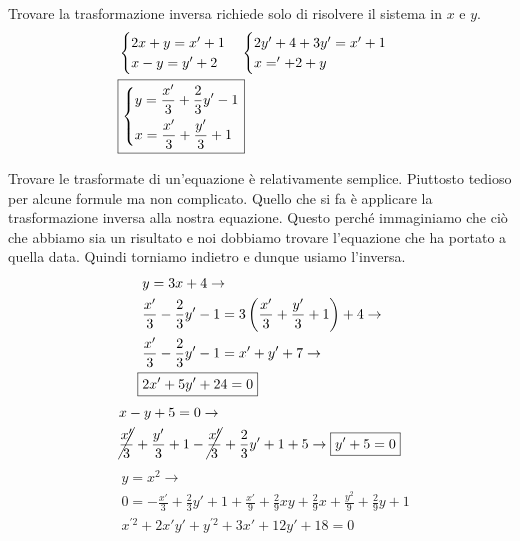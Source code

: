 Trovare la trasformazione inversa richiede solo di risolvere il sistema in $x$ e $y$.
\begin{align*}
&\begin{cases}
2x+y=x'+1\\
x-y=y'+2
\end{cases}
\begin{cases}
2y'+4+3y'=x'+1\\
x='+2+y
\end{cases}\\
&\boxed{\begin{dcases}
y = \frac{x'}{3}+\frac{2}{3}y'-1\\
x = \frac{x'}{3}+\frac{y'}{3}+1
\end{dcases}}
\end{align*}


Trovare le trasformate di un'equazione è relativamente semplice. Piuttosto tedioso per alcune formule
ma non complicato. Quello che si fa è applicare la trasformazione inversa alla nostra equazione.
Questo perché immaginiamo che ciò che abbiamo sia un risultato e noi dobbiamo trovare l'equazione
che ha portato a quella data. Quindi torniamo indietro e dunque usiamo l'inversa.
\begin{align*}
&y=3x+4 \rightarrow\\
&\frac{x'}{3}-\frac{2}{3}y'-1=3\left(\frac{x'}{3}+\frac{y'}{3}+1\right)+4 \rightarrow\\
&\frac{x'}{3}-\frac{2}{3}y'-1=x'+y'+7\rightarrow\\\Aboxed{&2x'+5y'+24=0}
\end{align*}
\begin{align*}
&x-y+5=0\rightarrow\\
&\cancel{\frac{x'}{3}}+\frac{y'}{3}+1-\cancel{\frac{x'}{3}}+\frac{2}{3}y'+1+5 \rightarrow
\boxed{y'+5=0}
\end{align*}
\begin{align*}
&y=x^2\rightarrow\\
&0=-\frac{x'}{3}+\frac{2}{3}y'+1+\frac{x'}{9}+\frac{2}{9}xy+\frac{2}{9}x+\frac{y^2}{9}+\frac{2}{9}y+1
\\ &\boxed{x^{'2}+2x'y'+y^{'2}+3x'+12y'+18=0}
\end{align*}

